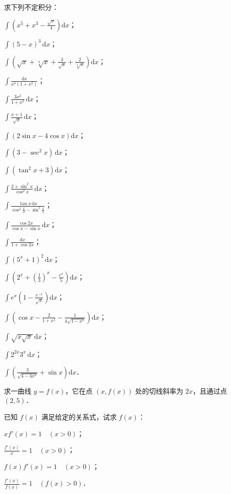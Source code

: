 \begin{xiti}
\item 求下列不定积分：
\begin{ziti}
\item $\int \left(x^5 + x^3 - \frac{\sqrt{x}}{4}\right)\mathrm{d}x$；
\item $\int (5 - x)^3\,\mathrm{d}x$；
\item $\int \left(\sqrt{x} + \sqrt[3]{x} + \frac{3}{\sqrt{x}} + \frac{2}{\sqrt[3]{x}}\right)\mathrm{d}x$；
\item $\int \frac{\mathrm{d}x}{x^4(1+x^2)}$；
\item $\int \frac{3x^2}{1 + x^2}\,\mathrm{d}x$；
\item $\int \frac{x + 1}{\sqrt{x}}\,\mathrm{d}x$；
\item $\int (2\sin x - 4\cos x)\mathrm{d}x$；
\item $\int (3 - \sec^2 x)\,\mathrm{d}x$；
\item $\int (\tan^2 x + 3)\mathrm{d}x$；
\item $\int \frac{2 + \sin^2 x}{\cos^2 x}\,\mathrm{d}x$；
\item $\int \frac{\tan x\,\mathrm{d}x}{\cos^2\frac{x}{2} - \sin^2\frac{x}{2}}$；
\item $\int \frac{\cos 2x}{\cos x - \sin x}\,\mathrm{d}x$；
\item $\int \frac{\mathrm{d}x}{1 + \cos 2x}$；
\item $\int (5^x + 1)^2\,\mathrm{d}x$；
\item $\int \left(2^x + \left(\frac{1}{3}\right)^x - \frac{e^x}{5}\right)\mathrm{d}x$；
\item $\int e^x\left(1 - \frac{e^{-x}}{\sqrt{x}}\right)\mathrm{d}x$；
\item $\int \left(\cos x - \frac{2}{1 + x^2} - \frac{1}{4\sqrt{1 - x^2}}\right)\mathrm{d}x$；
\item $\int \sqrt{x\sqrt{x}}\,\mathrm{d}x$；
\item $\int 2^{2x} 3^x\,\mathrm{d}x$；
\item $\int \left(\frac{3}{\sqrt{4 - 4x^2}} + \sin x\right)\mathrm{d}x$．
\end{ziti}
\item 求一曲线 $y = f(x)$，它在点 $(x, f(x))$ 处的切线斜率为 $2x$，且通过点 $(2, 5)$．
\item 已知 $f(x)$ 满足给定的关系式，试求 $f(x)$：
\begin{ziti}
\item $x f'(x) = 1\quad (x > 0)$；
\item $\frac{f'(x)}{x} = 1\quad (x > 0)$；
\item $f(x)f'(x) = 1\quad (x > 0)$；
\item $\frac{f'(x)}{f(x)} = 1\quad (f(x) > 0)$．
\end{ziti}
\end{xiti}
